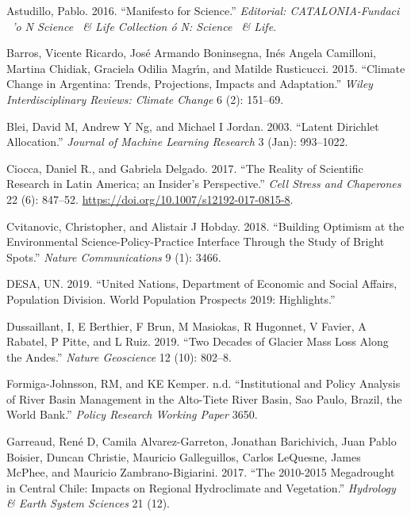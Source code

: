 \documentclass[]{article}
\begin{document}
\leavevmode\hypertarget{ref-Astudillo2016}{}%
Astudillo, Pablo. 2016. ``Manifesto for Science.'' \emph{Editorial:
CATALONIA-Fundaci ~'o N Science ~\& Life Collection ó N: Science ~\&
Life}.

\leavevmode\hypertarget{ref-Barros2015}{}%
Barros, Vicente Ricardo, José Armando Boninsegna, Inés Angela Camilloni,
Martina Chidiak, Graciela Odilia Magrı́n, and Matilde Rusticucci. 2015.
``Climate Change in Argentina: Trends, Projections, Impacts and
Adaptation.'' \emph{Wiley Interdisciplinary Reviews: Climate Change} 6
(2): 151--69.

\leavevmode\hypertarget{ref-Blei2003}{}%
Blei, David M, Andrew Y Ng, and Michael I Jordan. 2003. ``Latent
Dirichlet Allocation.'' \emph{Journal of Machine Learning Research} 3
(Jan): 993--1022.

\leavevmode\hypertarget{ref-Ciocca2017}{}%
Ciocca, Daniel R., and Gabriela Delgado. 2017. ``The Reality of
Scientific Research in Latin America; an Insider's Perspective.''
\emph{Cell Stress and Chaperones} 22 (6): 847--52.
\url{https://doi.org/10.1007/s12192-017-0815-8}.

\leavevmode\hypertarget{ref-Cvitanovic2018}{}%
Cvitanovic, Christopher, and Alistair J Hobday. 2018. ``Building
Optimism at the Environmental Science-Policy-Practice Interface Through
the Study of Bright Spots.'' \emph{Nature Communications} 9 (1): 3466.

\leavevmode\hypertarget{ref-desa2019united}{}%
DESA, UN. 2019. ``United Nations, Department of Economic and Social
Affairs, Population Division. World Population Prospects 2019:
Highlights.''

\leavevmode\hypertarget{ref-Dussaillant2019}{}%
Dussaillant, I, E Berthier, F Brun, M Masiokas, R Hugonnet, V Favier, A
Rabatel, P Pitte, and L Ruiz. 2019. ``Two Decades of Glacier Mass Loss
Along the Andes.'' \emph{Nature Geoscience} 12 (10): 802--8.

\leavevmode\hypertarget{ref-Formiga2005}{}%
Formiga-Johnsson, RM, and KE Kemper. n.d. ``Institutional and Policy
Analysis of River Basin Management in the Alto-Tiete River Basin, Sao
Paulo, Brazil, the World Bank.'' \emph{Policy Research Working Paper}
3650.

\leavevmode\hypertarget{ref-Garreaud2017}{}%
Garreaud, René D, Camila Alvarez-Garreton, Jonathan Barichivich, Juan
Pablo Boisier, Duncan Christie, Mauricio Galleguillos, Carlos LeQuesne,
James McPhee, and Mauricio Zambrano-Bigiarini. 2017. ``The 2010-2015
Megadrought in Central Chile: Impacts on Regional Hydroclimate and
Vegetation.'' \emph{Hydrology \& Earth System Sciences} 21 (12).
\end{document}
